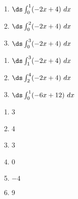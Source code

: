 {\noindent
\begin{minipage}{\linewidth}
\end{minipage}

\noindent\begin{minipage}[t]{.49\linewidth}
\begin{enumerate}
\item		$\ds \int_0^1 (-2x+4)\ dx$
\item		$\ds \int_0^2 (-2x+4)\ dx$
\item		$\ds \int_0^3 (-2x+4)\ dx$
\end{enumerate}
\end{minipage}
\begin{minipage}[t]{.49\linewidth}
\begin{enumerate}\addtocounter{enumii}{3}
\item		$\ds \int_1^3 (-2x+4)\ dx$
\item		$\ds \int_2^4 (-2x+4)\ dx$
\item		$\ds \int_0^1 (-6x+12)\ dx$
\end{enumerate}
\end{minipage}
}
{\begin{enumerate}
\item		3
\item		4
\item		3
\item		0
\item		$-4$
\item		9
\end{enumerate}
}

